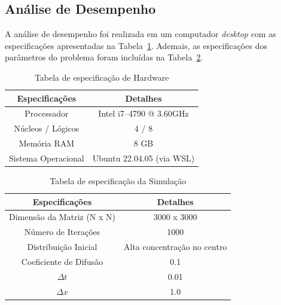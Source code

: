 \documentclass[12pt]{article}
\begin{document}
\subsection{Análise de Desempenho}

A análise de desempenho foi realizada em um computador \textit{desktop} com as
especificações apresentadas na Tabela~\ref{tab:especificacaoHardware}. Ademais,
as especificações dos parâmetros do
problema foram incluídas na Tabela~\ref{tab:especificacaoSimulacao}.

\begin{table}[ht]
  \centering
  \caption{Tabela de especificação de Hardware}
  \vspace{0.3cm}
  \begin{tabular}{||c c||}
    \hline
    Especificações      & Detalhes                  \\ [0.5ex]
    \hline\hline
    Processador         & Intel i7--4790 @ 3.60GHz  \\
    \hline
    Núcleos / Lógicos   & 4 / 8                     \\
    \hline
    Memória RAM         & 8 GB                      \\
    \hline
    Sistema Operacional & Ubuntu 22.04.05 (via WSL) \\
    \hline
  \end{tabular}
  \label{tab:especificacaoHardware}
\end{table}

\begin{table}[ht]
  \centering
  \caption{Tabela de especificação da Simulação}
  \vspace{0.3cm}
  \begin{tabular}{||c c||}
    \hline
    Especificações             & Detalhes                    \\ [0.5ex]
    \hline\hline
    Dimensão da Matriz (N x N) & 3000 x 3000                 \\
    \hline
    Número de Iterações        & 1000                        \\
    \hline
    Distribuição Inicial       & Alta concentração no centro \\
    \hline
    Coeficiente de Difusão     & 0.1                         \\
    \hline
    $\Delta t$                         & 0.01                        \\
    \hline
    $\Delta x$                         & 1.0                         \\
    \hline
  \end{tabular}
  \label{tab:especificacaoSimulacao}
\end{table}
\end{document}
